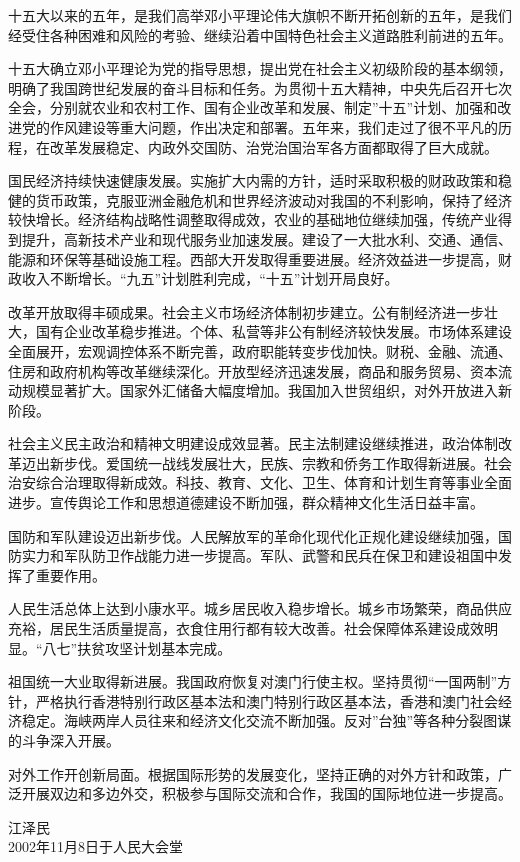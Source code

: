 \documentclass[adobefonts]{njuthesis}
\begin{document}
%
\begin{preface}

十五大以来的五年，是我们高举邓小平理论伟大旗帜不断开拓创新的五年，是我们经受住各种困难和风险的考验、继续沿着中国特色社会主义道路胜利前进的五年。 

十五大确立邓小平理论为党的指导思想，提出党在社会主义初级阶段的基本纲领，明确了我国跨世纪发展的奋斗目标和任务。为贯彻十五大精神，中央先后召开七次全会，分别就农业和农村工作、国有企业改革和发展、制定”十五”计划、加强和改进党的作风建设等重大问题，作出决定和部署。五年来，我们走过了很不平凡的历程，在改革发展稳定、内政外交国防、治党治国治军各方面都取得了巨大成就。 

国民经济持续快速健康发展。实施扩大内需的方针，适时采取积极的财政政策和稳健的货币政策，克服亚洲金融危机和世界经济波动对我国的不利影响，保持了经济较快增长。经济结构战略性调整取得成效，农业的基础地位继续加强，传统产业得到提升，高新技术产业和现代服务业加速发展。建设了一大批水利、交通、通信、能源和环保等基础设施工程。西部大开发取得重要进展。经济效益进一步提高，财政收入不断增长。“九五”计划胜利完成，“十五”计划开局良好。 

改革开放取得丰硕成果。社会主义市场经济体制初步建立。公有制经济进一步壮大，国有企业改革稳步推进。个体、私营等非公有制经济较快发展。市场体系建设全面展开，宏观调控体系不断完善，政府职能转变步伐加快。财税、金融、流通、住房和政府机构等改革继续深化。开放型经济迅速发展，商品和服务贸易、资本流动规模显著扩大。国家外汇储备大幅度增加。我国加入世贸组织，对外开放进入新阶段。 

社会主义民主政治和精神文明建设成效显著。民主法制建设继续推进，政治体制改革迈出新步伐。爱国统一战线发展壮大，民族、宗教和侨务工作取得新进展。社会治安综合治理取得新成效。科技、教育、文化、卫生、体育和计划生育等事业全面进步。宣传舆论工作和思想道德建设不断加强，群众精神文化生活日益丰富。 

国防和军队建设迈出新步伐。人民解放军的革命化现代化正规化建设继续加强，国防实力和军队防卫作战能力进一步提高。军队、武警和民兵在保卫和建设祖国中发挥了重要作用。 

人民生活总体上达到小康水平。城乡居民收入稳步增长。城乡市场繁荣，商品供应充裕，居民生活质量提高，衣食住用行都有较大改善。社会保障体系建设成效明显。“八七”扶贫攻坚计划基本完成。 

祖国统一大业取得新进展。我国政府恢复对澳门行使主权。坚持贯彻“一国两制”方针，严格执行香港特别行政区基本法和澳门特别行政区基本法，香港和澳门社会经济稳定。海峡两岸人员往来和经济文化交流不断加强。反对”台独”等各种分裂图谋的斗争深入开展。 

对外工作开创新局面。根据国际形势的发展变化，坚持正确的对外方针和政策，广泛开展双边和多边外交，积极参与国际交流和合作，我国的国际地位进一步提高。 

\vspace{1cm}
\begin{flushright}
江泽民\\
2002年11月8日于人民大会堂
\end{flushright}

\end{preface}
\end{document}
